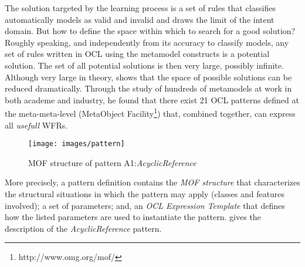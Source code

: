 The solution targeted by the learning process is a set of rules that classifies automatically models as valid and invalid and draws the limit of the intent domain. But how to define the space within which to search for a good solution? Roughly speaking, and independently from its accuracy to classify models, any set of rules written in OCL using the metamodel constructs is a potential solution. The set of all potential solutions is then very large, possibly infinite.
Although very large in theory, \cite{cadavid2012-t} shows that the space of possible solutions can be reduced dramatically. Through the study of hundreds of metamodels at work in both academe and industry, he found that there exist 21 OCL patterns defined at the meta-meta-level (MetaObject Facility\footnote{http://www.omg.org/mof/}) that, combined together, can express all \textit{usefull} WFRs. 

\begin{figure}[h]
	\centering
	\texttt{[image: images/pattern]}
	\caption{MOF structure of pattern A1:\textit{AcyclicReference}}
	\label{fig:patternA1}
\end{figure}

More precisely, a pattern definition contains the \textit{MOF structure} that characterizes the structural situations in which the pattern may apply (\eg classes and features involved); a set of parameters; and, an \textit{OCL Expression Template} that defines how the listed parameters are used to instantiate the pattern. 
 gives the description of the \textit{AcyclicReference} pattern.



